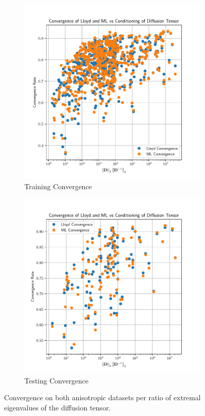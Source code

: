 \documentclass{article}
\begin{document}
\begin{figure}[h!]
  \centering
  \begin{subfigure}[t]{0.49\textwidth}
    \centering
    \includegraphics[width=\textwidth]{aniso3d_train_convergence_per_cond.pdf}
    \caption{Training Convergence}
  \end{subfigure}
  \begin{subfigure}[t]{0.49\textwidth}
    \centering
    \includegraphics[width=\textwidth]{aniso3d_test_convergence_per_cond.pdf}
    \caption{Testing Convergence}
  \end{subfigure}
  \caption{Convergence on both anisotropic datasets per ratio of extremal eigenvalues of the diffusion tensor.}
  \label{fig:aniso_conv_per_eps}
\end{figure}
\end{document}

